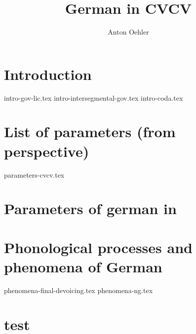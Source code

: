 \documentclass[
]{scrartcl}
\title{German in CVCV}
\author{Anton Oehler}
\begin{document}
\maketitle


\tableofcontents

\section{Introduction}
{intro-gov-lic.tex}
{intro-intersegmental-gov.tex}
{intro-coda.tex}


\section{List of parameters (from \CVCV perspective)}
{parameters-cvcv.tex}

\section{Parameters of german in \CVCV}

\section{Phonological processes and phenomena of German}
{phenomena-final-devoicing.tex}
{phenomena-ng.tex}

\section{test}
 
\begin{structure}
    \wordstart
    \V{\textschwa}
    \fen

\end{structure}

\begin{structure}
    \wordstart
    \emptyV
    \V[floating]{\textschwa}
    \fen

\end{structure}
\end{document}
